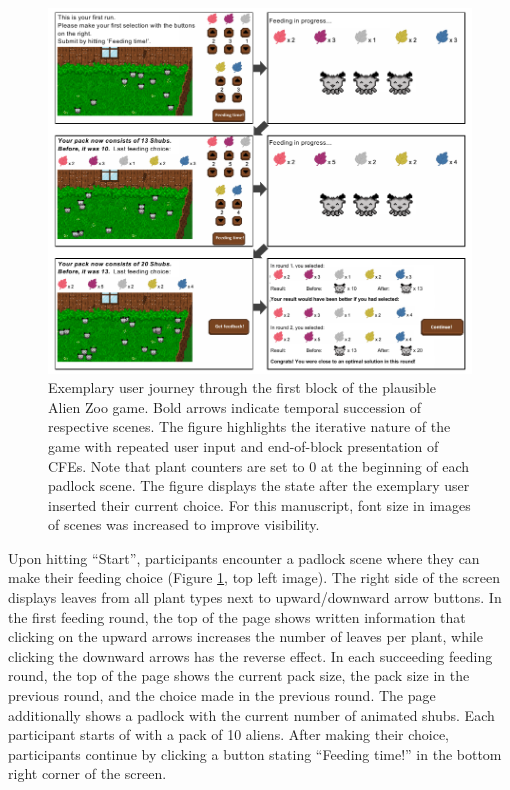 \begin{figure}
   \centering
   \includegraphics[width=\textwidth]{./media/FigureGameInterface.pdf}
   \caption{Exemplary user journey through the first block of the plausible Alien Zoo game. Bold arrows indicate temporal succession of respective scenes. The figure highlights the iterative nature of the game with repeated user input and end-of-block presentation of \glspl{CFE}. Note that plant counters are set to 0 at the beginning of each padlock scene. The figure displays the state after the exemplary user inserted their current choice. For this manuscript, font size in images of scenes was increased to improve visibility.}
   \label{fig:StudyStructure2}
 \end{figure}

Upon hitting ``Start'', participants encounter a padlock scene where they can make their feeding choice (Figure \ref{fig:StudyStructure2}, top left image).
The right side of the screen displays leaves from all plant types next to upward/downward arrow buttons. 
In the first feeding round, the top of the page shows written information that clicking on the upward arrows increases the number of leaves per plant, while clicking the downward arrows has the reverse effect.
In each succeeding feeding round, the top of the page shows the current pack size, the pack size in the previous round, and the choice made in the previous round.
The page additionally shows a padlock with the current number of animated shubs.
Each participant starts of with a pack of 10 aliens.
After making their choice, participants continue by clicking a button stating ``Feeding time!'' in the bottom right corner of the screen.

